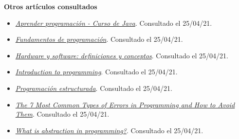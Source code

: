 \documentclass[
]{book}
\providecommand{\tightlist}{%
  \setlength{\itemsep}{0pt}\setlength{\parskip}{0pt}}
\begin{document}
\textbf{Otros artículos consultados}

\begin{itemize}
\tightlist
\item
  \href{https://www.aprenderprogramacion.com.ar/2020/03/1-breve-historia-de-la-programacion.html}{\emph{Aprender programación - Curso de Java}}. Consultado el 25/04/21.
\item
  \href{http://www.utn.edu.ec/reduca/programacion/fundamentos/fundamentos_de_programacin.html}{\emph{Fundamentos de programación}}. Consultado el 25/04/21.
\item
  \href{https://www.profesionalreview.com/2019/11/10/hardware-software-definiciones/}{\emph{Hardware y software: definiciones y conceptos}}. Consultado el 25/04/21.
\item
  \href{https://www.bbc.co.uk/bitesize/guides/zts8d2p/revision/1}{\emph{Introduction to programming}}. Consultado el 25/04/21.
\item
  \href{http://www1.frm.utn.edu.ar/informatica1/VIANI/PROGRAMACION\%20ESTRUCTURADA/PROGRAMACION\%20ESTRUCTURADA.PDF}{\emph{Programación estructurada}}. Consultado el 25/04/21.
\item
  \href{https://textexpander.com/blog/the-7-most-common-types-of-errors-in-programming-and-how-to-avoid-them}{\emph{The 7 Most Common Types of Errors in Programming and How to Avoid Them}}. Consultado el 25/04/21.
\item
  \href{https://levelup.gitconnected.com/what-is-abstraction-in-programming-2f35c8c72e15}{\emph{What is abstraction in programming?}}. Consultado el 25/04/21.
\end{itemize}
\end{document}
